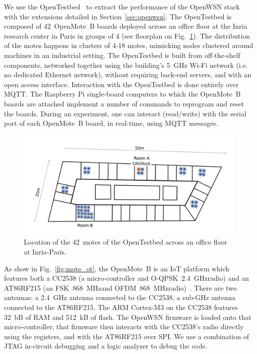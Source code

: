 \documentclass[sensors,article,submit,moreauthors,pdftex]{Definitions/mdpi}
\newcommand{\fsk}           {FSK~868~MHz}
\newcommand{\oqpsk}         {O-QPSK~2.4~GHz}
\newcommand{\ofdm}          {OFDM~868~MHz}
\newcommand{\figwidth}      {0.85}
\begin{document}
We use the OpenTestbed~\cite{munoz19opentestbed} to extract the performance of the OpenWSN stack with the extensions detailed in Section~\ref{sec:openwsn}.
The OpenTestbed is composed of 42~OpenMote~B boards deployed across an office floor at the Inria research center in Paris in groups of 4 (see floorplan on Fig.~\ref{fig:building_motes}).
The distribution of the motes happens in clusters of 4-18 motes, mimicking nodes clustered around machines in an industrial setting.
The OpenTestbed is built from off-the-shelf components,
    networked together using the building's 5~GHz Wi-Fi network (i.e. no dedicated Ethernet network),
    without requiring back-end servers, and
    with an open access interface.
Interaction with the OpenTestbed is done entirely over MQTT.
The Raspberry Pi single-board computers to which the OpenMote~B boards are attached implement a number of commands to reprogram and reset the boards.
During an experiment, one can interact (read/write) with the serial port of each OpenMote~B board, in real-time, using MQTT messages.

\begin{figure}
	\centering
	\includegraphics[width=\figwidth\columnwidth]{building_motes}
	\caption{Location of the 42~motes of the OpenTestbed across an office floor at Inria-Paris.}
    \label{fig:building_motes}
\end{figure}


As show in Fig.~\ref{fig:mote_ot}, the OpenMote~B is an IoT platform which features both
    a CC2538 (a micro-controller and \oqpsk radio) and
    an AT86RF215 (an \fsk and \ofdm radio)~\cite{tuset16openmote}.
There are two antennas:
    a 2.4~GHz antenna connected to the CC2538,
    a sub-GHz antenna connected to the AT86RF215.
The ARM Cortex-M3 on the CC2538 features 32~bB of RAM and 512~kB of flash.
The OpenWSN firmware is loaded onto that micro-controller;
    that firmware then interacts with the CC2538's radio directly using the registers,
    and with the AT86RF215 over SPI.
We use a combination of JTAG in-circuit debugging and a logic analyzer to debug the code.
\end{document}
